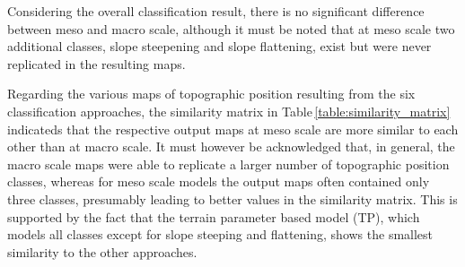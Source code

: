 \documentclass[preprint,12pt,authoryear]{elsarticle}
\begin{document}
Considering the overall classification result, there is no significant difference between meso and macro scale, although it must be noted that at meso scale two additional classes, slope steepening and slope flattening, exist but were never replicated in the resulting maps.

Regarding the various maps of topographic position resulting from the six classification approaches, the similarity matrix in Table\,\ref{table:similarity_matrix} indicateds that the respective output maps at meso scale are more similar to each other than at macro scale. It must however be acknowledged that, in general, the macro scale maps  were able to replicate a larger number of topographic position classes, whereas for meso scale models the output maps often contained only three classes, presumably leading to better values in the similarity matrix. This is supported by the fact that the terrain parameter based model (TP), which models all classes except for slope steeping and flattening, shows the smallest similarity to the other approaches.
\end{document}
